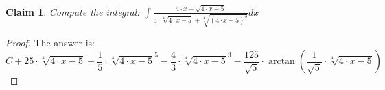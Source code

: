 \documentclass{article}
\newtheorem{theorem}{Claim}
\begin{document}
\begin{theorem}
Compute the integral:
$ \int \frac{ 4 \cdot x+\sqrt{4 \cdot x-5} }{ 5 \cdot \sqrt[4]{4 \cdot x-5}+\sqrt[4]{(4 \cdot x-5)^3} }   dx $
\end{theorem}

\begin{proof}
The answer is:
\[
C+25\cdot\sqrt[4]{4\cdot x-5}+\frac{1}{5}\cdot\sqrt[4]{4\cdot x-5}^5-\frac{4}{3}\cdot\sqrt[4]{4\cdot x-5}^3-\frac{125}{\sqrt{5}}\cdot\arctan\left(\frac{1}{\sqrt{5}}\cdot\sqrt[4]{4\cdot x-5}\right)
\]
\end{proof}
\end{document}
